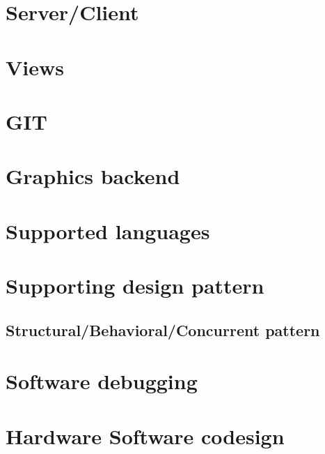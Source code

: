 
\section{Server/Client}


\section{Views}


\section{GIT}


\section{Graphics backend}


\section{Supported languages}


\section{Supporting design pattern}


\subsection{Structural/Behavioral/Concurrent pattern}

\section{Software debugging}


\section{Hardware Software codesign}


